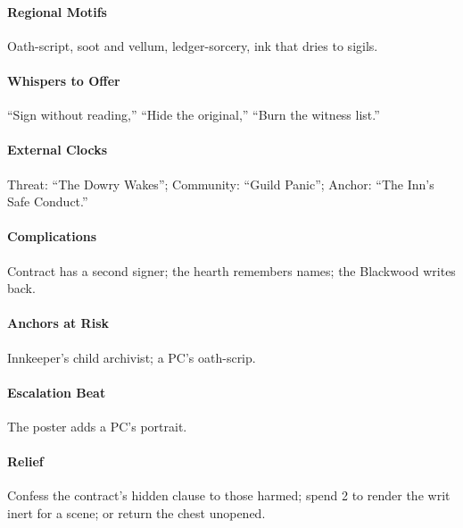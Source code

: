 \paragraph{Regional Motifs} Oath-script, soot and vellum, ledger-sorcery, ink that dries to sigils.
\paragraph{Whispers to Offer} ``Sign without reading,'' ``Hide the original,'' ``Burn the witness list.''
\paragraph{External Clocks} Threat: ``The Dowry Wakes''; Community: ``Guild Panic''; Anchor: ``The Inn’s Safe Conduct.''
\paragraph{Complications} Contract has a second signer; the hearth remembers names; the Blackwood writes back.
\paragraph{Anchors at Risk} Innkeeper’s child archivist; a PC’s oath-scrip.
\paragraph{Escalation Beat} The poster adds a PC’s portrait.
\paragraph{Relief} Confess the contract’s hidden clause to those harmed; spend 2 \Boons{} to render the writ inert for a scene; or return the chest unopened.
